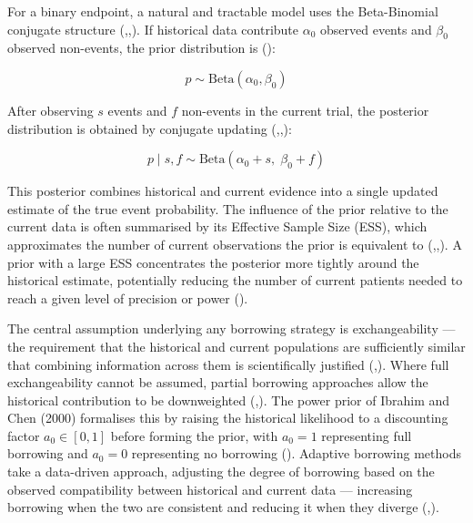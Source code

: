 \documentclass{article}
\begin{document}
For a binary endpoint, a natural and tractable model uses the
Beta-Binomial conjugate structure
(,,).
If historical data contribute \(\alpha_0\) observed events and
\(\beta_0\) observed non-events, the prior distribution is
():

\[p \sim \text{Beta}(\alpha_0, \beta_0)\]

After observing \(s\) events and \(f\) non-events in the current trial,
the posterior distribution is obtained by conjugate updating
(,,):

\[p \mid s, f \sim \text{Beta}(\alpha_0 + s,\; \beta_0 + f)\]

This posterior combines historical and current evidence into a single
updated estimate of the true event probability. The influence of the
prior relative to the current data is often summarised by its Effective
Sample Size (ESS), which approximates the number of current observations
the prior is equivalent to
(,,).
A prior with a large ESS concentrates the posterior more tightly around
the historical estimate, potentially reducing the number of current
patients needed to reach a given level of precision or power
().

The central assumption underlying any borrowing strategy is
exchangeability --- the requirement that the historical and current
populations are sufficiently similar that combining information across
them is scientifically justified
(,).
Where full exchangeability cannot be assumed, partial borrowing
approaches allow the historical contribution to be downweighted
(,).
The power prior of Ibrahim and Chen (2000) formalises this by raising
the historical likelihood to a discounting factor \(a_0 \in [0,1]\)
before forming the prior, with \(a_0 = 1\) representing full borrowing
and \(a_0 = 0\) representing no borrowing
(). Adaptive borrowing methods take
a data-driven approach, adjusting the degree of borrowing based on the
observed compatibility between historical and current data ---
increasing borrowing when the two are consistent and reducing it when
they diverge
(,).
\end{document}
